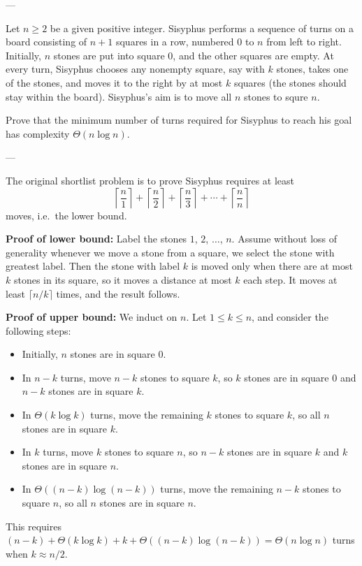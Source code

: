 
---

Let $n\ge2$ be a given positive integer. Sisyphus performs a sequence of turns on a board consisting of $n+1$ squares in a row, numbered $0$ to $n$ from left to right. Initially, $n$ stones are put into square $0$, and the other squares are empty. At every turn, Sisyphus chooses any nonempty square, say with $k$ stones, takes one of the stones, and moves it to the right by at most $k$ squares (the stones should stay within the board). Sisyphus's aim is to move all $n$ stones to squre $n$.

Prove that the minimum number of turns required for Sisyphus to reach his goal has complexity $\Theta(n\log n)$.

---

\begin{boxremark}
    The original shortlist problem is to prove Sisyphus requires at least \[\left\lceil\frac n1\right\rceil+\left\lceil\frac n2\right\rceil+\left\lceil\frac n3\right\rceil+\cdots+\left\lceil\frac nn\right\rceil\]
    moves, i.e.\ the lower bound.
\end{boxremark}

\textbf{Proof of lower bound:} Label the stones $1$, $2$, $\ldots$, $n$. Assume without loss of generality whenever we move a stone from a square, we select the stone with greatest label. Then the stone with label $k$ is moved only when there are at most $k$ stones in its square, so it moves a distance at most $k$ each step. It moves at least $\lceil n/k\rceil$ times, and the result follows.

\bigskip

\textbf{Proof of upper bound:} We induct on $n$. Let $1\le k\le n$, and consider the following steps:
\begin{itemize}
    \item Initially, $n$ stones are in square $0$.
    \item In $n-k$ turns, move $n-k$ stones to square $k$, so $k$ stones are in square $0$ and $n-k$ stones are in square $k$.
    \item In $\Theta(k\log k)$ turns, move the remaining $k$ stones to square $k$, so all $n$ stones are in square $k$.
    \item In $k$ turns, move $k$ stones to square $n$, so $n-k$ stones are in square $k$ and $k$ stones are in square $n$.
    \item In $\Theta( (n-k)\log(n-k))$ turns, move the remaining $n-k$ stones to square $n$, so all $n$ stones are in square $n$.
\end{itemize}
This requires $(n-k)+\Theta(k\log k)+k+\Theta( (n-k)\log(n-k))=\Theta(n\log n)$ turns when $k\approx n/2$.

